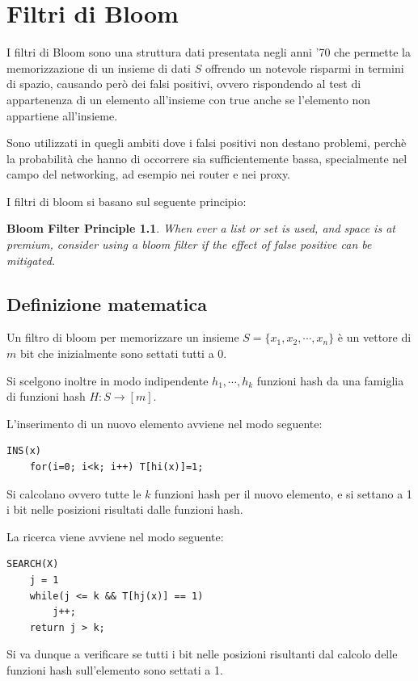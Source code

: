 \documentclass[a4paper,11pt]{book}
\begin{document}
\chapter{Filtri di Bloom}

I filtri di Bloom sono una struttura dati presentata negli anni '70 che permette la memorizzazione di un insieme di dati $S$ offrendo un notevole risparmi in termini di spazio, causando per\`o dei falsi positivi, ovvero rispondendo al test di appartenenza di un elemento all'insieme con \textsf{true} anche se l'elemento non appartiene all'insieme.

Sono utilizzati in quegli ambiti dove i falsi positivi non destano problemi, perch\`e la probabilit\`a che hanno di occorrere sia sufficientemente bassa, specialmente nel campo del networking, ad esempio nei router e nei proxy.

I filtri di bloom si basano sul seguente principio:
\newtheorem{bloom}{Bloom Filter Principle}
\begin{bloom}
When ever a list or set is used, and space is at premium, consider using a bloom filter if the effect of false positive can be mitigated.
\end{bloom}

\section{Definizione matematica}

Un filtro di bloom per memorizzare un insieme $S = \{x_1, x_2, \cdots, x_n\}$ \`e un vettore di $m$ bit che inizialmente sono settati tutti a 0.

Si scelgono inoltre in modo indipendente $h_1, \cdots, h_k$ funzioni hash da una famiglia di funzioni hash $H: S \rightarrow [m]$.

L'inserimento di un nuovo elemento avviene nel modo seguente:
\begin{verbatim}
INS(x)
    for(i=0; i<k; i++) T[hi(x)]=1;
\end{verbatim}
Si calcolano ovvero tutte le $k$ funzioni hash per il nuovo elemento, e si settano a 1 i bit nelle posizioni risultati dalle funzioni hash.

La ricerca viene avviene nel modo seguente:
\begin{verbatim}
SEARCH(X)
    j = 1
    while(j <= k && T[hj(x)] == 1)
        j++;
    return j > k;
\end{verbatim}
Si va dunque a verificare se tutti i bit nelle posizioni risultanti dal calcolo delle funzioni hash sull'elemento sono settati a 1.
\end{document}
